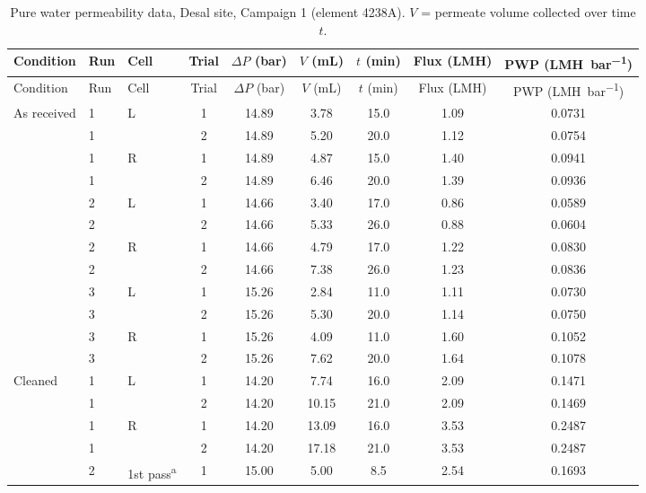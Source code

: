 {\footnotesize\setlength{\tabcolsep}{4pt}
\begin{longtable}{lllcccccc}
  \caption{Pure water permeability data, Desal site, Campaign 1 (element 4238A). $V$ = permeate volume collected over time $t$.}
  \label{tab:app-c1-4238A-pwp}\\
  \toprule
  Condition & Run & Cell & Trial & $\Delta P$ (\unit{bar}) & $V$ (\unit{mL}) & $t$ (\unit{min}) & Flux (\unit{LMH}) & PWP (\unit{LMH.bar^{-1}}) \\
  \midrule
  \endfirsthead
  \toprule
  Condition & Run & Cell & Trial & $\Delta P$ (\unit{bar}) & $V$ (\unit{mL}) & $t$ (\unit{min}) & Flux (\unit{LMH}) & PWP (\unit{LMH.bar^{-1}}) \\
  \midrule
  \endhead
    As received & 1 & L & 1 & 14.89 & 3.78 & 15.0 & 1.09 & 0.0731 \\
     & 1 &  & 2 & 14.89 & 5.20 & 20.0 & 1.12 & 0.0754 \\
    \addlinespace[2pt]
     & 1 & R & 1 & 14.89 & 4.87 & 15.0 & 1.40 & 0.0941 \\
     & 1 &  & 2 & 14.89 & 6.46 & 20.0 & 1.39 & 0.0936 \\
    \addlinespace[2pt]
     & 2 & L & 1 & 14.66 & 3.40 & 17.0 & 0.86 & 0.0589 \\
     & 2 &  & 2 & 14.66 & 5.33 & 26.0 & 0.88 & 0.0604 \\
    \addlinespace[2pt]
     & 2 & R & 1 & 14.66 & 4.79 & 17.0 & 1.22 & 0.0830 \\
     & 2 &  & 2 & 14.66 & 7.38 & 26.0 & 1.23 & 0.0836 \\
    \addlinespace[2pt]
     & 3 & L & 1 & 15.26 & 2.84 & 11.0 & 1.11 & 0.0730 \\
     & 3 &  & 2 & 15.26 & 5.30 & 20.0 & 1.14 & 0.0750 \\
    \addlinespace[2pt]
     & 3 & R & 1 & 15.26 & 4.09 & 11.0 & 1.60 & 0.1052 \\
     & 3 &  & 2 & 15.26 & 7.62 & 20.0 & 1.64 & 0.1078 \\
    \midrule
    Cleaned & 1 & L & 1 & 14.20 & 7.74 & 16.0 & 2.09 & 0.1471 \\
     & 1 &  & 2 & 14.20 & 10.15 & 21.0 & 2.09 & 0.1469 \\
    \addlinespace[2pt]
     & 1 & R & 1 & 14.20 & 13.09 & 16.0 & 3.53 & 0.2487 \\
     & 1 &  & 2 & 14.20 & 17.18 & 21.0 & 3.53 & 0.2487 \\
    \addlinespace[2pt]
     & 2 & 1st pass\textsuperscript{a} & 1 & 15.00 & 5.00 & 8.5 & 2.54 & 0.1693 \\

\end{longtable}}
